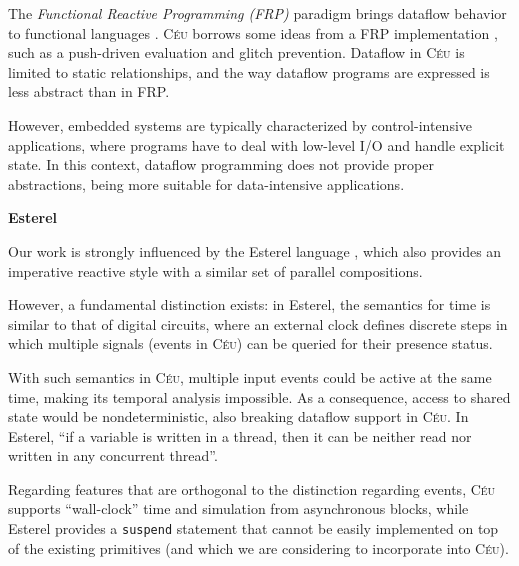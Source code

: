 \documentclass[11pt,a4paper]{article}
\newcommand{\2}{\;\;}
\newcommand{\5}{\;\;\;\;\;}
\newcommand{\CEU}{\textsc{C\'{e}u}}
\newcommand{\code}[1] {{\small{\texttt{#1}}}}
\begin{document}
The \emph{Functional Reactive Programming (FRP)} paradigm brings dataflow 
behavior to functional languages \cite{frp.principles}.
\CEU{} borrows some ideas from a FRP implementation \cite{frtime.embedding}, 
such as a push-driven evaluation and glitch prevention.
Dataflow in \CEU{} is limited to static relationships, and the way dataflow 
programs are expressed is less abstract than in FRP.

However, embedded systems are typically characterized by control-intensive 
applications, where programs have to deal with low-level I/O and handle 
explicit state.
In this context, dataflow programming does not provide proper abstractions, 
being more suitable for data-intensive applications.

\textbf{Esterel}

Our work is strongly influenced by the Esterel language \cite{esterel.design}, 
which also provides an imperative reactive style with a similar set of parallel 
compositions.

However, a fundamental distinction exists: in Esterel, the semantics for time 
is similar to that of digital circuits, where an external clock defines 
discrete steps in which multiple signals (events in \CEU{}) can be queried for 
their presence status.

With such semantics in \CEU{}, multiple input events could be active at the 
same time, making its temporal analysis impossible.
As a consequence, access to shared state would be nondeterministic, also 
breaking dataflow support in \CEU{}.
In Esterel, ``if a variable is written in a thread, then it can be neither read 
nor written in any concurrent thread''.~\cite{esterel.primer}

Regarding features that are orthogonal to the distinction regarding events, 
\CEU{} supports ``wall-clock'' time and simulation from asynchronous blocks, 
while Esterel provides a \code{suspend} statement that cannot be easily 
implemented on top of the existing primitives (and which we are considering to 
incorporate into \CEU).

\end{document}
